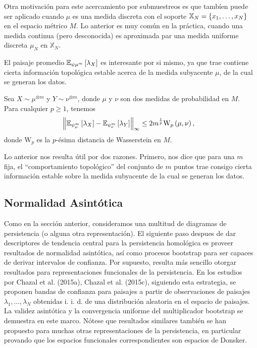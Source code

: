 Otra motivaci\'on para este acercamiento por submuestreos es que
tamb\'ien puede ser aplicado cuando $\mu$ es una medida discreta con el soporte
$\mathbb{X}_{N}=\left\{x_{1},\dots,x_{N}\right\}$ en el espacio m\'etrico $M$.
Lo anterior es muy com\'un en la pr\'actica, cuando una medida continua (pero desconocida)
es aproximada par una medida uniforme discreta $\mu_{N}$ en $\mathbb{X}_{N}$.


El paisaje promedio $\mathbb{E}_{\psi{\mu}^{m}}\left[\lambda_{X}\right]$ es interesante por si mismo,
ya que trae contiene cierta informaci\'on topol\'ogica estable
acerca de la medida subyacente $\mu$,
de la cual se generan los datos.

\begin{teorema}
     Sea $X\sim\mu^{\otimes m}$ y
    $Y\sim\nu^{\otimes m}$, donde $\mu$ y $\nu$ son dos medidas de probabilidad en $M$.
    Para cualquier $p\geq 1$, tenemos
    \begin{equation*}
        \left\|\mathbb{E}_{\psi_{\mu}^{m}}\left[\lambda_{X}\right]-
        \mathbb{E}_{\psi_{\nu}^{m}}\left[\lambda_{Y}\right]\right\|_{\infty}\leq
        2 m^{\frac{1}{p}} \mathrm{W}_{p}\left(\mu,\nu\right),
    \end{equation*}
    donde $\mathrm{W}_{p}$ es la $p$-\'esima distancia de Wasserstein en $M$.
\end{teorema}

Lo anterior nos resulta \'util por dos razones. Primero, nos dice que para una $m$ fija,
el ``comportamiento topol\'ogico'' del conjunto de $m$ puntos
trae consigo cierta informaci\'on estable sobre la medida subyacente de la cual se
generan los datos.

\subsection{Normalidad Asint\'otica}

Como en la secci\'on anterior, consideramos una multitud de diagramas de persistencia
(o alguna otra representaci\'on). El siguiente paso despues de dar descriptores
de tendencia central para la persistencia homol\'ogica es proveer resultados de
normalidad asint\'otica, as\'i como procesos bootstrap para ser capaces de derivar
intervalos de confianza. Por supuesto, resulta m\'as sencillo otorgar resultados para
representaciones funcionales de la persistencia. En los estudios por
Chazal et al. (2015a)\cite{Chazal2015b}, Chazal et al. (2015c)\cite{Chazal2015c},
siguiendo esta estrategia, se proponen bandas de confianza para paisajes a partir de
observaciones de paisajes $\lambda_{1},\dots,\lambda_{N}$ obtenidas i. i. d. de
una distribuci\'on aleatoria en el espacio de paisajes.
La validez asint\'otica y la convergencia uniforme del multiplicador bootstrap
se demuestra en este marco.
N\'otese que resultados similares tambi\'en se han propuesto para muchas otras representaciones
de la persistencia, en particular provando que los espacios funcionales correspondientes son
espacios de Donsker.

